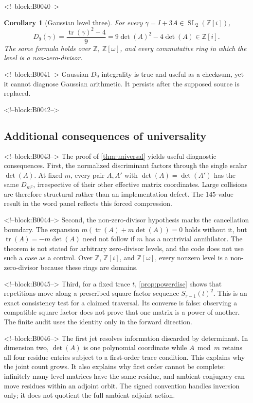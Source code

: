 \documentclass[11pt,a4paper]{article}
\newtheorem{corollary}[theorem]{Corollary}
\theoremstyle{definition}
\theoremstyle{remark}
\newcommand{\SL}{\operatorname{SL}}
\newcommand{\tr}{\operatorname{tr}}
\newcommand{\Gauss}{\mathbb{Z}[i]}
\newcommand{\Eis}{\mathbb{Z}[\omega]}
\begin{document}
<!--block:B0040-->
\begin{corollary}[Gaussian level three]\label{cor:d9}
For every \(\gamma=I+3A\in\SL_2(\Gauss)\),
\[
 D_9(\gamma)=\frac{\tr(\gamma)^2-4}{9}=9\det(A)^2-4\det(A)\in\Gauss.
\]
The same formula holds over \(\mathbb Z\), \(\Eis\), and every commutative ring in which the level is a non-zero-divisor.
\end{corollary}

<!--block:B0041-->
Gaussian \(D_9\)-integrality is true and useful as a checksum, yet it cannot diagnose Gaussian arithmetic. It persists after the supposed source is replaced.

<!--block:B0042-->
\subsection{Additional consequences of universality}

<!--block:B0043-->
The proof of \cref{thm:universal} yields useful diagnostic consequences. First, the normalized discriminant factors through the single scalar \(\det(A)\). At fixed \(m\), every pair \(A,A'\) with \(\det(A)=\det(A')\) has the same \(D_{m^2}\), irrespective of their other effective matrix coordinates. Large collisions are therefore structural rather than an implementation defect. The 145-value result in the word panel reflects this forced compression.

<!--block:B0044-->
Second, the non-zero-divisor hypothesis marks the cancellation boundary. The expansion \(m(\tr(A)+m\det(A))=0\) holds without it, but \(\tr(A)=-m\det(A)\) need not follow if \(m\) has a nontrivial annihilator. The theorem is not stated for arbitrary zero-divisor levels, and the code does not use such a case as a control. Over \(\mathbb Z\), \(\Gauss\), and \(\Eis\), every nonzero level is a non-zero-divisor because these rings are domains.

<!--block:B0045-->
Third, for a fixed trace \(t\), \cref{prop:powerdisc} shows that repetitions move along a prescribed square-factor sequence \(S_{r-1}(t)^2\). This is an exact consistency test for a claimed traversal. Its converse is false: observing a compatible square factor does not prove that one matrix is a power of another. The finite audit uses the identity only in the forward direction.

<!--block:B0046-->
The first jet resolves information discarded by determinant. In dimension two, \(\det(A)\) is one polynomial coordinate while \(A\bmod m\) retains all four residue entries subject to a first-order trace condition. This explains why the joint count grows. It also explains why first order cannot be complete: infinitely many level matrices have the same residue, and ambient conjugacy can move residues within an adjoint orbit. The signed convention handles inversion only; it does not quotient the full ambient adjoint action.
\end{document}
